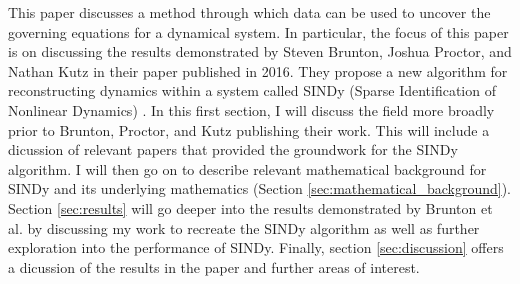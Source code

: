 \documentclass[10pt]{paper}
\begin{document}
This paper discusses a method through which data can be used to uncover the governing equations for a dynamical system. 
%
In particular, the focus of this paper is on discussing the results demonstrated by Steven Brunton, Joshua Proctor, and Nathan Kutz in their paper published in 2016. They propose a new algorithm for reconstructing dynamics within a system called SINDy (Sparse Identification of Nonlinear Dynamics) \cite{sindy}.
In this first section, I will discuss the field more broadly prior to Brunton, Proctor, and Kutz publishing their work. This will include a dicussion of relevant papers that provided the groundwork for the SINDy algorithm.
I will then go on to describe relevant mathematical background for SINDy and its underlying mathematics (Section \ref{sec:mathematical_background}). Section \ref{sec:results} will go deeper into the results demonstrated by Brunton et al. by discussing my work to recreate the SINDy algorithm as well as further exploration into the performance of SINDy. 
Finally, section \ref{sec:discussion} offers a dicussion of the results in the paper and further areas of interest. 
\end{document}
